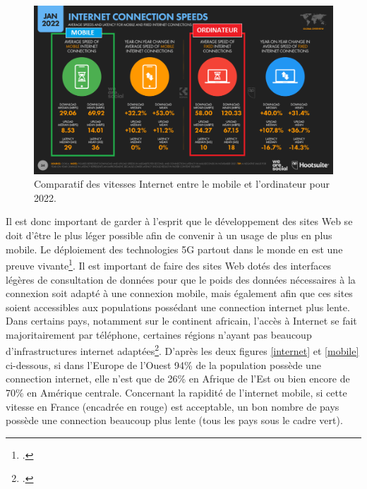 \documentclass[a4paper,12pt,twoside]{book}
\begin{document}
\begin{figure}[H]
    \centering
    \includegraphics[width=\linewidth]{img/partie_3/speed.png}
    \caption[Comparatif des vitesses Internet entre le mobile et l'ordinateur pour 2022]{Comparatif des vitesses Internet entre le mobile et l'ordinateur pour 2022.\footnotemark}
    \label{speed}
\end{figure}


Il est donc important de garder à l'esprit que le développement des sites Web se doit d'être le plus léger possible afin de convenir à un usage de plus en plus mobile. Le déploiement des technologies 5G partout dans le monde en est une preuve vivante\footcite{cinqg}. Il est important de faire des sites Web dotés des interfaces légères de consultation de données pour que le poids des données nécessaires à la connexion soit adapté à une connexion mobile, mais également afin que ces sites soient accessibles aux populations possédant une connection internet plus lente. Dans certains pays, notamment sur le continent africain, l'accès à Internet se fait majoritairement par téléphone, certaines régions n'ayant pas beaucoup d'infrastructures internet adaptées\footcite{africa}. D'après les deux figures \ref{internet} et \ref{mobile} ci-dessous, si dans l'Europe de l'Ouest 94\% de la population possède une connection internet, elle n'est que de 26\% en Afrique de l'Est ou bien encore de 70\% en Amérique centrale. Concernant la rapidité de l'internet mobile, si cette vitesse en France (encadrée en rouge) est acceptable, un bon nombre de pays possède une connection beaucoup plus lente (tous les pays sous le cadre vert).
\end{document}
